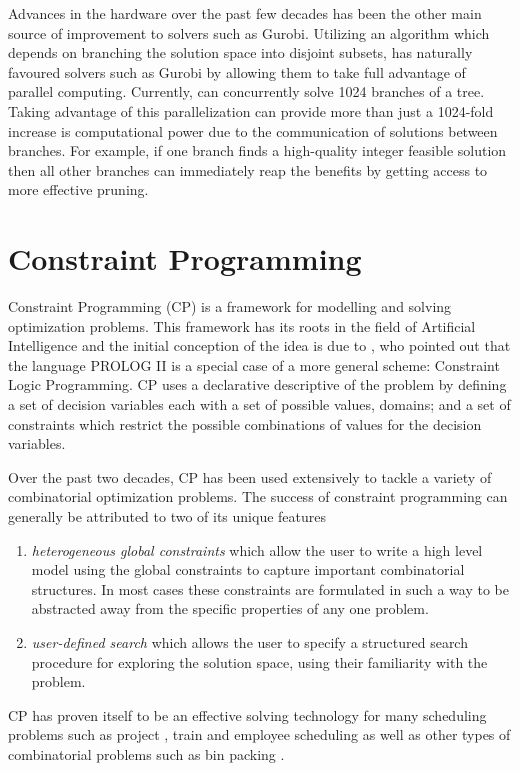 Advances in the hardware over the past few decades
has been the other main source of improvement to solvers such as Gurobi.
Utilizing an algorithm which depends on branching the solution space
into disjoint subsets, has naturally favoured solvers such as Gurobi
by allowing them to take full advantage of parallel computing.
Currently, \gurobi can concurrently solve 1024 branches of
a \bab tree.
Taking advantage of this parallelization can provide
more than just a 1024-fold increase is computational power
due to the communication of solutions between branches.
For example, if one branch finds a high-quality integer feasible solution
then all other branches can immediately reap the benefits
by getting access to more effective pruning.

\section{Constraint Programming}
\label{sec:lit:cp}
Constraint Programming (CP) is a framework for modelling and solving optimization problems.
This framework has its roots in the field of Artificial Intelligence and the initial
conception of the idea is due to ,
who pointed out that the language PROLOG II is a special
case of a more general scheme: Constraint Logic Programming. 
CP uses a declarative descriptive of the problem by defining a set of decision variables
each with a set of possible values, \ie domains;
and a set of constraints which restrict the possible combinations of values for the
decision variables.

Over the past two decades, CP has been used extensively
to tackle a variety of combinatorial optimization problems.
The success of constraint programming can generally be attributed
to two of its unique features
\begin{enumerate}
	\item \emph{heterogeneous global constraints} which allow the user to write a high level
	model using the global constraints to capture important combinatorial structures.
	In most cases these constraints are formulated in such a way to be abstracted 
	away from the specific properties of any one problem.
	\item \emph{user-defined search} which allows the user to specify a structured
	search procedure for exploring the solution space, using their familiarity
	with the problem.
\end{enumerate}

CP has proven itself to be an effective solving technology
for many scheduling problems such as project \cite{Berthold2010}, 
train \cite{Rodriguez2007} and 
employee scheduling \cite{Demassey2005}
as well as other types of combinatorial problems such as bin packing \cite{Pisinger2007}.

